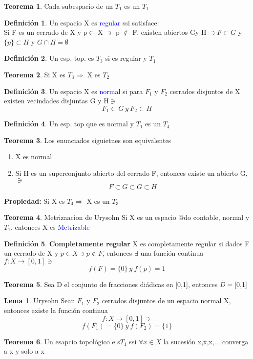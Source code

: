 \documentclass{article}
\theoremstyle{definition}
\newtheorem{definition}{Definición}[section]
\newtheorem{theorem}{Teorema}[section]
\newtheorem{lemma}{Lema}[section]
\begin{document}
\begin{theorem}
	Cada subespacio de un $T_1$ es un $T_1$
\end{theorem}
\begin{definition}
	Un espacio X es \textcolor{blue}{regular} ssi satisface:\\
	Si F es un cerrado de X y p$\in$ X $\ni$ p $\not\in$ F, existen abiertos Gy H $\ni F\subset G$ y $\{p\}\subset H$ y $G\cap H=\emptyset$
\end{definition}
\begin{definition}
	Un esp. top. es $T_3$ si es regular y $T_1$
\end{definition}
\begin{theorem}
	Si X es $T_3\Rightarrow$ X es $T_2$
\end{theorem}
\begin{definition}
	Un espacio X es \textcolor{blue}{normal} si para $F_1$ y $F_2$ cerrados disjuntos de X existen vecindades disjuntas G y H$\ni$
	\[F_1\subset G\ y \ F_2\subset H\]
\end{definition}
\begin{definition}
	Un esp. top que es normal y $T_1$ es un $T_4$
\end{definition}
\begin{theorem}

	Los enunciados siguietnes son equivalentes
	\begin{enumerate}
		\item X es normal
		\item Si H es un superconjunto abierto del cerrado F, entonces existe un abierto G, $\ni$
		\[F\subset G\subset \overline{G}\subset H\]
	\end{enumerate}
\end{theorem}
\textbf{Propiedad: }
Si X es $T_4\Rightarrow$ X es un $T_3$
\begin{theorem}{Metrizaacion de Urysohn}
	Si X es un espacio @do contable, normal y $T_1$, entonces X es \textcolor{blue}{Metrizable}
\end{theorem}
\begin{definition}\textbf{Completamente regular}
	X es completamente regular si dados F un cerrado de X y $p\in X\ni p\not\in F$, entonces $\exists$ una función continua $f:X\to [0,1]\ni$
	\[f(F)=\{0\}\ y \ f(p)= 1\]
\end{definition}
\begin{theorem}
	Sea D el conjunto de fracciones diádicas en [0,1], entonces $\overline{D}=$[0,1]
\end{theorem}
\begin{lemma}{Urysohn}
	Sean $F_1$ y $F_2$ cerrados disjuntos de un espacio normal X, entonces existe la función continua 
	\[f:X\to[0,1]\ni\]
	\[f(F_1)=\{0\}\ y \ f(F_2)=\{1\}\]
\end{lemma}
\begin{theorem}
	Un esapcio topológico e s$T_1$ ssi $\forall x\in X$ la sucesión x,x,x,... converga a x y solo a x
\end{theorem}
\end{document}
